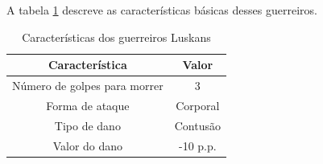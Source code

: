 A tabela \ref{table:luskans} descreve as características básicas desses guerreiros.
\begin{table}[H]
\begin{center}
\begin{tabular}{|c|c|}
\hline 
\textbf{Característica} & \textbf{Valor} \\ 
\hline 
Número de golpes para morrer & 3\\ 
\hline 
Forma de ataque & Corporal\\ 
\hline 
Tipo de dano &  Contusão \\ 
\hline 
Valor do dano & -10 p.p. \\ 
\hline 
\end{tabular} 
\end{center}
\caption{Características dos guerreiros Luskans}
\label{table:luskans}
\end{table}
